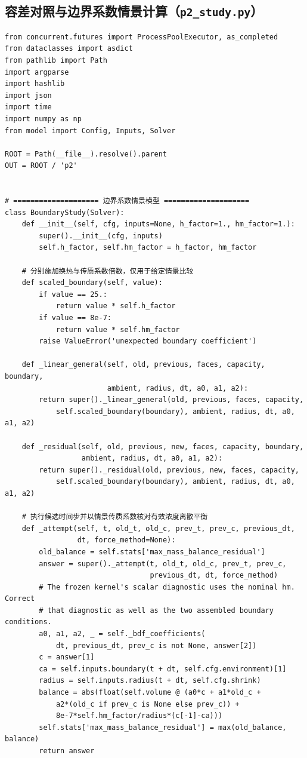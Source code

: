 \subsection{容差对照与边界系数情景计算（\texttt{p2\_study.py}）}
\begin{Verbatim}[fontsize=\scriptsize,breaklines=true,breakanywhere=true]
from concurrent.futures import ProcessPoolExecutor, as_completed
from dataclasses import asdict
from pathlib import Path
import argparse
import hashlib
import json
import time
import numpy as np
from model import Config, Inputs, Solver

ROOT = Path(__file__).resolve().parent
OUT = ROOT / 'p2'


# ==================== 边界系数情景模型 ====================
class BoundaryStudy(Solver):
    def __init__(self, cfg, inputs=None, h_factor=1., hm_factor=1.):
        super().__init__(cfg, inputs)
        self.h_factor, self.hm_factor = h_factor, hm_factor

    # 分别施加换热与传质系数倍数，仅用于给定情景比较
    def scaled_boundary(self, value):
        if value == 25.:
            return value * self.h_factor
        if value == 8e-7:
            return value * self.hm_factor
        raise ValueError('unexpected boundary coefficient')

    def _linear_general(self, old, previous, faces, capacity, boundary,
                        ambient, radius, dt, a0, a1, a2):
        return super()._linear_general(old, previous, faces, capacity,
            self.scaled_boundary(boundary), ambient, radius, dt, a0, a1, a2)

    def _residual(self, old, previous, new, faces, capacity, boundary,
                  ambient, radius, dt, a0, a1, a2):
        return super()._residual(old, previous, new, faces, capacity,
            self.scaled_boundary(boundary), ambient, radius, dt, a0, a1, a2)

    # 执行候选时间步并以情景传质系数核对有效浓度离散平衡
    def _attempt(self, t, old_t, old_c, prev_t, prev_c, previous_dt,
                 dt, force_method=None):
        old_balance = self.stats['max_mass_balance_residual']
        answer = super()._attempt(t, old_t, old_c, prev_t, prev_c,
                                  previous_dt, dt, force_method)
        # The frozen kernel's scalar diagnostic uses the nominal hm. Correct
        # that diagnostic as well as the two assembled boundary conditions.
        a0, a1, a2, _ = self._bdf_coefficients(
            dt, previous_dt, prev_c is not None, answer[2])
        c = answer[1]
        ca = self.inputs.boundary(t + dt, self.cfg.environment)[1]
        radius = self.inputs.radius(t + dt, self.cfg.shrink)
        balance = abs(float(self.volume @ (a0*c + a1*old_c +
            a2*(old_c if prev_c is None else prev_c)) +
            8e-7*self.hm_factor/radius*(c[-1]-ca)))
        self.stats['max_mass_balance_residual'] = max(old_balance, balance)
        return answer


\end{Verbatim}
